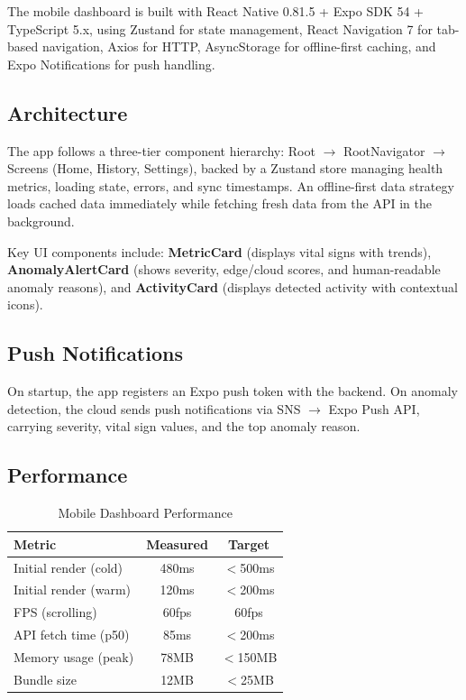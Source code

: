 \documentclass[conference]{IEEEtran}
\begin{document}
The mobile dashboard is built with React Native 0.81.5 + Expo SDK 54 + TypeScript 5.x, using Zustand for state management, React Navigation 7 for tab-based navigation, Axios for HTTP, AsyncStorage for offline-first caching, and Expo Notifications for push handling.

\subsection{Architecture}
The app follows a three-tier component hierarchy: Root $\rightarrow$ RootNavigator $\rightarrow$ Screens (Home, History, Settings), backed by a Zustand store managing health metrics, loading state, errors, and sync timestamps. An offline-first data strategy loads cached data immediately while fetching fresh data from the API in the background.

Key UI components include: \textbf{MetricCard} (displays vital signs with trends), \textbf{AnomalyAlertCard} (shows severity, edge/cloud scores, and human-readable anomaly reasons), and \textbf{ActivityCard} (displays detected activity with contextual icons).

\subsection{Push Notifications}
On startup, the app registers an Expo push token with the backend. On anomaly detection, the cloud sends push notifications via SNS $\rightarrow$ Expo Push API, carrying severity, vital sign values, and the top anomaly reason.

\subsection{Performance}

\begin{table}[H]
\centering
\caption{Mobile Dashboard Performance}
\label{tab:perf}
\begin{tabular}{lcc}
\toprule
\textbf{Metric} & \textbf{Measured} & \textbf{Target} \\
\midrule
Initial render (cold) & 480ms & $<$500ms \\
Initial render (warm) & 120ms & $<$200ms \\
FPS (scrolling) & 60fps & 60fps \\
API fetch time (p50) & 85ms & $<$200ms \\
Memory usage (peak) & 78MB & $<$150MB \\
Bundle size & 12MB & $<$25MB \\
\bottomrule
\end{tabular}
\end{table}
\end{document}
